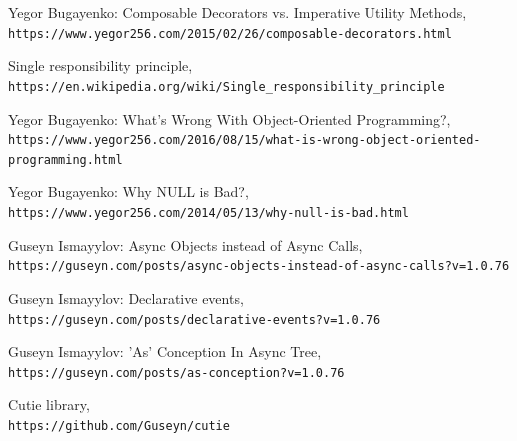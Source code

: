 \documentclass{article}
\begin{document}
\begin{thebibliography}{9}

Yegor Bugayenko: Composable Decorators vs. Imperative Utility Methods,
\\\texttt{https://www.yegor256.com/2015/02/26/composable-decorators.html}

Single responsibility principle,
\\\texttt{https://en.wikipedia.org/wiki/Single\_responsibility\_principle}

Yegor Bugayenko: What's Wrong With Object-Oriented Programming?,
\\\texttt{https://www.yegor256.com/2016/08/15/what-is-wrong-object-oriented-programming.html}

Yegor Bugayenko: Why NULL is Bad?,
\\\texttt{https://www.yegor256.com/2014/05/13/why-null-is-bad.html}

Guseyn Ismayylov: Async Objects instead of Async Calls,
\\\texttt{https://guseyn.com/posts/async-objects-instead-of-async-calls?v=1.0.76}

Guseyn Ismayylov: Declarative events,
\\\texttt{https://guseyn.com/posts/declarative-events?v=1.0.76}

Guseyn Ismayylov: 'As' Conception In Async Tree,
\\\texttt{https://guseyn.com/posts/as-conception?v=1.0.76}

Cutie library,
\\\texttt{https://github.com/Guseyn/cutie}

\end{thebibliography}

\newpage

\tableofcontents
\end{document}
